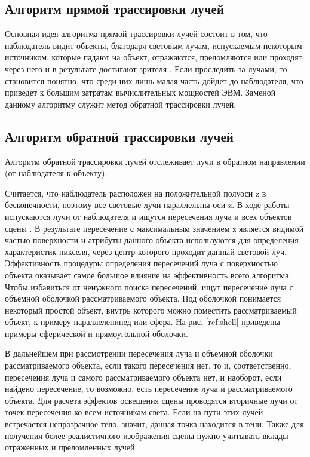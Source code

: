 \subsection{Алгоритм прямой трассировки лучей}

Основная идея алгоритма прямой трассировки лучей состоит в том, что наблюдатель видит объекты, благодаря световым лучам, испускаемым некоторым источником, которые падают на объект, отражаются, преломляются или проходят через него и в результате достигают зрителя \cite{tr3}. Если проследить за лучами, то становится понятно, что среди них лишь малая часть дойдет до наблюдателя, что приведет к большим затратам вычислительных мощностей ЭВМ. Заменой данному алгоритму служит метод обратной трассировки лучей.

\subsection{Алгоритм обратной трассировки лучей}

Алгоритм обратной трассировки лучей отслеживает лучи в обратном направлении (от наблюдателя к объекту).

Считается, что наблюдатель расположен на положительной полуоси z в бесконечности, поэтому все световые лучи параллельны оси z. В ходе работы испускаются лучи от наблюдателя и ищутся пересечения луча и всех объектов сцены \cite{tr3}. В результате пересечение с максимальным значением z является видимой частью поверхности и атрибуты данного объекта используются для определения характеристик пикселя, через центр которого проходит данный световой луч. Эффективность процедуры определения пересечений луча с поверхностью объекта оказывает самое большое влияние на эффективность всего алгоритма.
Чтобы избавиться от ненужного поиска пересечений, ищут пересечение луча с объемной оболочкой рассматриваемого объекта. Под оболочкой понимается некоторый простой объект, внутрь которого можно поместить рассматриваемый объект, к примеру параллелепипед или сфера.
На рис. \ref{ref:shell} приведены примеры сферической и прямоугольной оболочки.

\begin{figure}[ht!]
\end{figure}

В дальнейшем при рассмотрении пересечения луча и объемной оболочки рассматриваемого объекта, если такого пересечения нет, то и, соответственно, пересечения луча и
самого рассматриваемого объекта нет, и наоборот, если найдено пересечение, то возможно, есть пересечение луча и рассматриваемого объекта.
Для расчета эффектов освещения сцены проводятся вторичные лучи от точек пересечения ко всем источникам света.
Если на пути этих лучей встречается непрозрачное тело, значит, данная точка находится в тени.
Также для получения более реалистичного изображения сцены нужно учитывать вклады отраженных и преломленных лучей.

